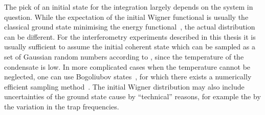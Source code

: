 The pick of an initial state for the integration largely depends on the system in question.
While the expectation of the initial Wigner functional is usually the classical ground state minimising the energy functional~, the actual distribution can be different.
For the interferometry experiments described in this thesis it is usually sufficient to assume the initial coherent state which can be sampled as a set of Gaussian random numbers according to , since the temperature of the condensate is low.
In more complicated cases when the temperature cannot be neglected, one can use Bogoliubov states~\cite{Blakie2008,Ruostekoski2010}, for which there exists a numerically efficient sampling method~\cite{Sinatra2002}.
The initial Wigner distribution may also include uncertainties of the ground state cause by ``technical'' reasons, for example the by the variation in the trap frequencies.
